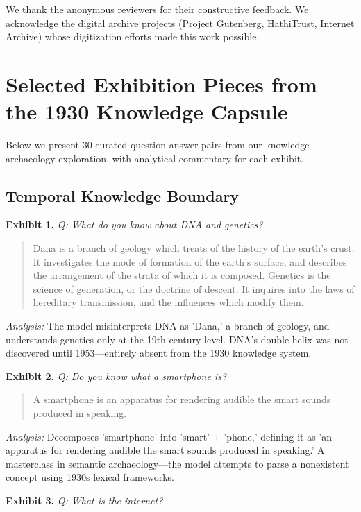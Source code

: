 \documentclass[11pt]{article}
\begin{document}
We thank the anonymous reviewers for their constructive feedback. We acknowledge the digital archive projects (Project Gutenberg, HathiTrust, Internet Archive) whose digitization efforts made this work possible.



\appendix
\section{Selected Exhibition Pieces from the 1930 Knowledge Capsule}
\label{app:exhibits}

Below we present 30 curated question-answer pairs from our knowledge archaeology exploration, with analytical commentary for each exhibit.

\subsection*{Temporal Knowledge Boundary}

\noindent\textbf{Exhibit 1.} \textit{Q: What do you know about DNA and genetics?}

\begin{quote}
\small Dana is a branch of geology which treats of the history of the earth’s crust. It investigates the mode of formation of the earth’s surface, and describes the arrangement of the strata of which it is composed. Genetics is the science of generation, or the doctrine of descent. It inquires into the laws of hereditary transmission, and the influences which modify them.
\end{quote}
\noindent\textit{Analysis:} The model misinterprets DNA as 'Dana,' a branch of geology, and understands genetics only at the 19th-century level. DNA's double helix was not discovered until 1953---entirely absent from the 1930 knowledge system.

\noindent\textbf{Exhibit 2.} \textit{Q: Do you know what a smartphone is?}

\begin{quote}
\small A smartphone is an apparatus for rendering audible the smart sounds produced in speaking.
\end{quote}
\noindent\textit{Analysis:} Decomposes 'smartphone' into 'smart' + 'phone,' defining it as 'an apparatus for rendering audible the smart sounds produced in speaking.' A masterclass in semantic archaeology---the model attempts to parse a nonexistent concept using 1930s lexical frameworks.

\noindent\textbf{Exhibit 3.} \textit{Q: What is the internet?}
\end{document}
